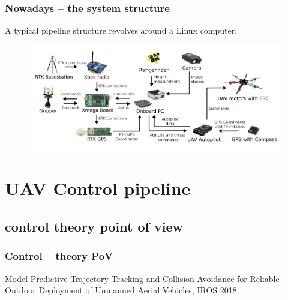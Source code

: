 \documentclass[aspectratio=1610]{beamer}
\begin{document}
\begin{frame}
  \frametitle{Nowadays -- the system structure}

  \begin{block}{A typical pipeline structure revolves around a Linux computer.}
    \begin{figure}
      \includegraphics[width=1.0\textwidth]{./fig/components.png}
    \end{figure}
  \end{block}

\end{frame}


\section{UAV Control pipeline}
\subsection{control theory point of view}

\begin{frame}
  \frametitle{Control -- theory PoV}

  \begin{figure}
    \begin{adjustbox}{max totalsize={1.0\textwidth}{.85\textheight}, center}
      
    \end{adjustbox}
  \end{figure}

  \begin{block}{\cite{iros}}
    Model Predictive Trajectory Tracking and Collision Avoidance for Reliable Outdoor Deployment of Unmanned Aerial Vehicles, IROS 2018.
  \end{block}

\end{frame}
\end{document}
